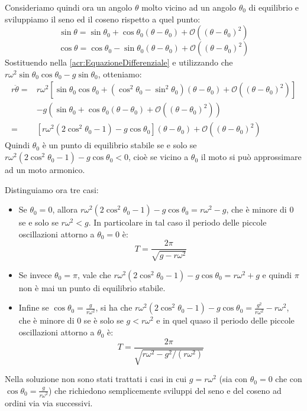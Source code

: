 \documentclass[../main.tex]{subfiles}
\begin{document}
Consideriamo quindi ora un angolo $\theta$ molto vicino ad un angolo $\theta_0$ di equilibrio e sviluppiamo il seno ed 
il coseno rispetto a quel punto:
\begin{equation}\label{acr:SviluppoSeno}
	\sin\theta=\sin\theta_0+\cos\theta_0(\theta-\theta_0)+\mathcal{O}((\theta-\theta_0)^2)
\end{equation}
\begin{equation}\label{acr:SviluppoCoseno}
	\cos\theta=\cos\theta_0-\sin\theta_0(\theta-\theta_0)+\mathcal{O}((\theta-\theta_0)^2)
\end{equation}
Sostituendo nella \cref{acr:EquazioneDifferenziale} e utilizzando che $r\omega^2\sin\theta_0\cos\theta_0-g\sin\theta_0$, 
otteniamo:
\begin{equation*}
\begin{split}
	r\ddot{\theta}	=& r\omega^2\left[\sin\theta_0\cos\theta_0+\left(\cos^2\theta_0-\sin^2\theta_0\right)
					(\theta-\theta_0)+\mathcal{O}((\theta-\theta_0)^2)\right]\\
					& -g\left(\sin\theta_0+\cos\theta_0(\theta-\theta_0)+\mathcal{O}((\theta-\theta_0)^2)\right)\\
					=& \left[ r\omega^2\left(2\cos^2\theta_0-1\right)-g\cos\theta_0 \right](\theta-\theta_0)
					+\mathcal{O}((\theta-\theta_0)^2)
\end{split}
\end{equation*}
Quindi $\theta_0$ è un punto di equilibrio stabile se e solo se $r\omega^2\left(2\cos^2\theta_0-1\right)-g\cos\theta_0<0$,
cioè se vicino a $\theta_0$ il moto si può approssimare ad un moto armonico.

Distinguiamo ora tre casi:
\begin{itemize}
	\item 	Se $\theta_0=0$, allora $r\omega^2\left(2\cos^2\theta_0-1\right)-g\cos\theta_0=r\omega^2-g$,
			che è minore di 0 se e solo se $r\omega^2<g$. In particolare in tal caso il periodo delle piccole
			oscillazioni attorno a $\theta_0=0$ è:
			\begin{equation*}
				T=\frac{2\pi}{\sqrt{g-r\omega^2}}
			\end{equation*}
	\item	Se invece $\theta_0=\pi$, vale che 
			$r\omega^2\left(2\cos^2\theta_0-1\right)-g\cos\theta_0=r\omega^2+g$ e quindi $\pi$
			non è mai un punto di equilibrio stabile.
	\item	Infine se $\cos\theta_0=\frac{g}{r\omega^2}$, si ha che
			$r\omega^2\left(2\cos^2\theta_0-1\right)-g\cos\theta_0=\frac{g^2}{r\omega^2}-r\omega^2$, che
			è minore di 0 se è solo se $g<r\omega^2$ e in quel quaso il periodo delle piccole oscillazioni
			attorno a $\theta_0$ è:
			\begin{equation*}
				T=\frac{2\pi}{\sqrt{r\omega^2-g^2/(r\omega^2)}}
			\end{equation*}
\end{itemize}

Nella soluzione non sono stati trattati i casi in cui $g=r\omega^2$ 
(sia con $\theta_0=0$ che con $\cos\theta_0=\frac{g}{r\omega^2}$) che richiedono semplicemente
sviluppi del seno e del coseno ad ordini via via successivi.


\solution[2]
\end{document}
